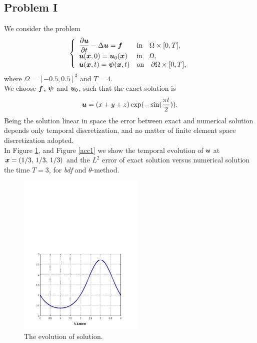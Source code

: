 \documentclass[english,a4paper]{article}
\newcommand{\psibf}{\text{\mbox{\boldmath $\psi$}}}
\newcommand{\ubf}{\text{\mbox{\boldmath $u$}}}
\newcommand{\xbf}{\text{\mbox{\boldmath $x$}}}
\newcommand{\fbf}{\text{\mbox{\boldmath $f$}}}
\begin{document}
\subsection{Problem I}
We consider the problem
\begin{equation}\label{ex1}
\left\{
\begin{array}{ll}
\displaystyle\frac{\partial \ubf}{\partial t} -\Delta \ubf = \fbf & \text{in}\quad
\Omega\times [0,T],\\
\displaystyle\ubf(\xbf, 0) =  \ubf_0(\xbf)  & \text{in}\quad \Omega,\\
\displaystyle\ubf(\xbf, t) = \psibf(\xbf, t)   & \text{on}\quad \partial\Omega\times[0,T],
\end{array}
\right.
\end{equation}
where $\Omega=[-0.5, 0.5]^3$ and $T=4$.\\
We choose $\fbf$, $\psibf$ and $\ubf_0$, such that the exact solution
is
\begin{equation}\label{u1ex1}
\ubf = (x+y+z)\exp(-\sin(\frac{\pi
  t}{2})).
\end{equation}
Being the solution linear in space the error  between exact and
numerical solution depends only temporal discretization, and no matter
of finite element space discretization adopted.\\
In Figure \ref{temporal_solution}, and Figure \ref{acc1} we show  the temporal
evolution  of $\ubf$ at $\xbf=(1/3,\,1/3,\,1/3)$ and  the $L^2$ error  of exact solution versus
numerical solution the time $T=3$, for {\sl bdf} and $\theta$-method.
\begin{center}
\begin{figure}[!h]
\centering\includegraphics[width=6cm, height=8cm\textwidth]{figures/tempo.pdf}
\caption{The evolution of solution.} \label{temporal_solution}
\end{figure}
\end{center}
\end{document}
